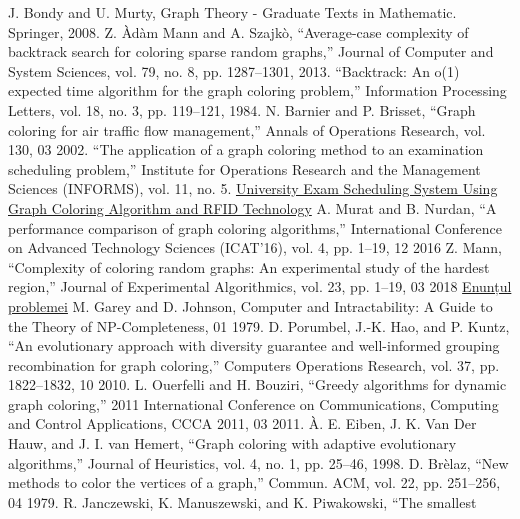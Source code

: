 \documentclass[runningheads]{llncs}
\begin{document}
%
%
%
% 
% 
%
\begin{thebibliography}{8}

J. Bondy and U. Murty, Graph Theory - Graduate Texts in Mathematic.
Springer, 2008.
Z. \`{A}d\`{a}m Mann and A. Szajk\`{o}, “Average-case complexity of backtrack
search for coloring sparse random graphs,” Journal of Computer and
System Sciences, vol. 79, no. 8, pp. 1287–1301, 2013.
“Backtrack: An o(1) expected time algorithm for the graph coloring
problem,” Information Processing Letters, vol. 18, no. 3, pp. 119–121,
1984.
N. Barnier and P. Brisset, “Graph coloring for air traffic flow management,” 
Annals of Operations Research, vol. 130, 03 2002.
“The application of a graph coloring method to an examination scheduling problem,” 
Institute for Operations Research and the Management
Sciences (INFORMS), vol. 11, no. 5.
\href{http://www.ijimt.org/papers/359-D0129.pdf}{University Exam Scheduling System Using Graph
Coloring Algorithm and RFID Technology}
A. Murat and B. Nurdan, “A performance comparison of graph coloring algorithms,” 
International Conference on Advanced Technology
Sciences (ICAT’16), vol. 4, pp. 1–19, 12 2016
Z. Mann, “Complexity of coloring random graphs: An experimental
study of the hardest region,” Journal of Experimental Algorithmics,
vol. 23, pp. 1–19, 03 2018
\href{https://acs-aa-challenge.github.io/acs-aa-challenge/18-np-2-colouring/}{Enunțul problemei}
M. Garey and D. Johnson, Computer and Intractability: A Guide to the
Theory of NP-Completeness, 01 1979.
D. Porumbel, J.-K. Hao, and P. Kuntz, “An evolutionary approach with
diversity guarantee and well-informed grouping recombination for graph
coloring,” Computers Operations Research, vol. 37, pp. 1822–1832, 10
2010.
L. Ouerfelli and H. Bouziri, “Greedy algorithms for dynamic graph coloring,” 2011 International Conference on Communications, Computing
and Control Applications, CCCA 2011, 03 2011.
\`{A}. E. Eiben, J. K. Van Der Hauw, and J. I. van Hemert, “Graph coloring
with adaptive evolutionary algorithms,” Journal of Heuristics, vol. 4,
no. 1, pp. 25–46, 1998.
D. Br\`{e}laz, “New methods to color the vertices of a graph,”  Commun.
ACM, vol. 22, pp. 251–256, 04 1979.
R. Janczewski, K. Manuszewski, and K. Piwakowski, “The smallest

\end{thebibliography}
\end{document}
